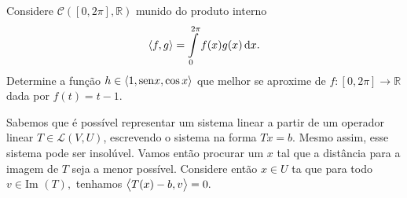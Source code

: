 \documentclass[11pt,a4paper]{article}
\begin{document}
 Considere $\mathcal{C}([0, 2 \pi], \mathbb{R})$ munido do produto interno
\[
\prin{f,g} = \displaystyle\int\limits_{0}^{2 \pi} f(x)g(x) \dif x.
\]
Determine a função $h \in \left\langle 1, {\rm sen} x, \cos x \right\rangle$ que melhor se aproxime de $f \colon [0, 2 \pi] \to \mathbb{R} $ dada por $f(t) = t - 1.$
\solucao{}

 Sabemos que é possível representar um sistema linear a partir de um operador linear $T \in \mathcal{L}(V,U)$, escrevendo o sistema na forma $Tx = b.$ Mesmo assim, esse sistema pode ser insolúvel. Vamos então procurar um $x$ tal que a distância para a imagem de $T$ seja a menor possível. Considere então $x \in U$ ta que para todo $v \in \mbox{Im }(T),$ tenhamos $\left\langle T(x)-b,v \right\rangle = 0.$
\end{document}
